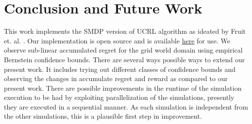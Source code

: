
\chapter{Conclusion and Future Work}

This work implements the SMDP version of UCRL algorithm as ideated by Fruit et. al. \cite{fruit_regret_2017}.
Our implementation is open source and is available \href{https://github.com/say4n/options}{here} for use.
We observe sub-linear accumulated regret for the grid world domain using empirical Bernstein confidence bounds.
There are several ways possible ways to extend our present work.
It includes trying out different classes of confidence bounds and observing the changes in accumulate regret and reward as compared to our present work.
There are possible improvements in the runtime of the simulation execution to be had by exploiting parallelization of the simulations, presently they are executed in a sequential manner.
As each simulation is independent from the other simulations, this is a plausible first step in improvement.

\newpage
